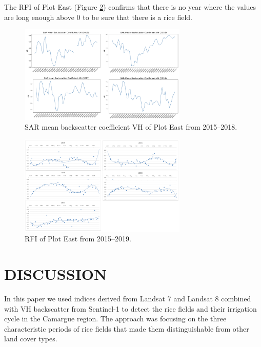 \documentclass[a4paper, 10pt, conference]{ieeeconf}      %
\begin{document}
The RFI of Plot East (Figure \ref{fig:rfieast}) confirms that there is no year where the values are long enough above 0 to be sure that there is a rice field.

\begin{figure}[h]
\centering
\includegraphics[width=8cm]{Figures/SAR_east.png}
\caption{SAR mean backscatter coefficient VH of Plot East from 2015–2018.}
\label{fig:sareast}
\end{figure}

\begin{figure}[h]
\centering
\includegraphics[width=8cm]{Figures/LSWI-NDVI+0.05_east.png}
\caption{RFI of Plot East from 2015–2019.}
\label{fig:rfieast}
\end{figure}

\section{DISCUSSION}

In this paper we used indices derived from Landsat 7 and Landsat 8 combined with VH backscatter from Sentinel-1 to detect the rice fields and their irrigation cycle in the Camargue region. The approach was focusing on the three characteristic periods of rice fields that made them distinguishable from other land cover types. 
\end{document}
